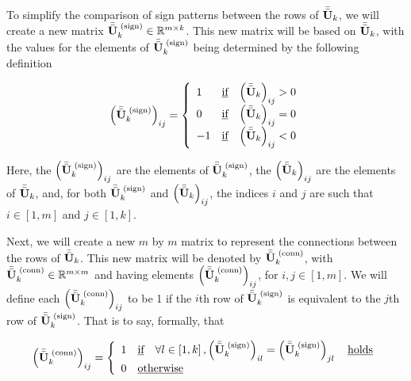 \documentclass[../../ClusteringConnectionsMAIN.tex]{subfiles}
\begin{document}
\begin{flushleft}
\begin{large}

To simplify the comparison of sign patterns between the rows of $\bar{\bar{\mathbf{U}}}_k$, we will create a new matrix $\bar{\bar{\mathbf{U}}}_k^\text{ (sign)} \in \mathbb{R}^{m \times k}$.  This new matrix will be based on $\bar{\bar{\mathbf{U}}}_k$, with the values for the elements of $\bar{\bar{\mathbf{U}}}_k^\text{ (sign)}$ being determined by the following definition

\begin{align}
\left( \bar{\bar{\mathbf{U}}}_k^\text{ (sign)} \right)_{ij} = \left\{ 
\begin{array}{l c l}
	1 & \text{\underline{if}} & \left( \bar{\bar{\mathbf{U}}}_k \right)_{ij} > 0 \\
	0 & \text{\underline{if}} & \left( \bar{\bar{\mathbf{U}}}_k \right)_{ij} = 0 \\
	-1 & \text{\underline{if}} & \left( \bar{\bar{\mathbf{U}}}_k \right)_{ij} < 0 \\
\end{array} \right.
\end{align}

Here, the $\left( \bar{\bar{\mathbf{U}}}_k^\text{ (sign)} \right)_{ij}$ are the elements of $\bar{\bar{\mathbf{U}}}_k^\text{ (sign)}$, the $\left( \bar{\bar{\mathbf{U}}}_k \right)_{ij}$ are the elements of $\bar{\bar{\mathbf{U}}}_k$, and, for both $ \bar{\bar{\mathbf{U}}}_k^\text{ (sign)}$ and $\left( \bar{\bar{\mathbf{U}}}_k \right)_{ij}$, the indices $i$ and $j$ are such that $i \in \left[ 1, m \right]$ and $j \in \left[ 1, k \right]$. \newline


Next, we will create a new $m$ by $m$ matrix to represent the connections between the rows of $\bar{\bar{\mathbf{U}}}_k$.  This new matrix will be denoted by $\bar{\bar{\mathbf{U}}}_k^\text{ (conn)}$, with $\bar{\bar{\mathbf{U}}}_k^\text{ (conn)} \in \mathbb{R}^{m \times m}$ and having elements $\left( \bar{\bar{\mathbf{U}}}_k^\text{ (conn)} \right)_{ij}$, for $i, j \in \left[ 1, m \right]$.  We will define each $\left( \bar{\bar{\mathbf{U}}}_k^\text{ (conn)} \right)_{ij}$ to be 1 if the $i$th row of $\bar{\bar{\mathbf{U}}}_k^\text{ (sign)}$ is equivalent to the $j$th row of $\bar{\bar{\mathbf{U}}}_k^\text{ (sign)}$.  That is to say, formally, that

\begin{align}
\left( \bar{\bar{\mathbf{U}}}_k^\text{ (conn)} \right)_{ij} = \left\{
\begin{array}{l l}
	1 & \text{\underline{if}} \quad \forall l \in \left[ 1, k \right], \left( \bar{\bar{\mathbf{U}}}_k^\text{ (sign)} \right)_{il} = \left( \bar{\bar{\mathbf{U}}}_k^\text{ (sign)} \right)_{jl} \quad \text{\underline{holds}} \\
	0 & \text{\underline{otherwise}} 
\end{array} \right.
\end{align}


\end{large}
\end{flushleft}
\end{document}
